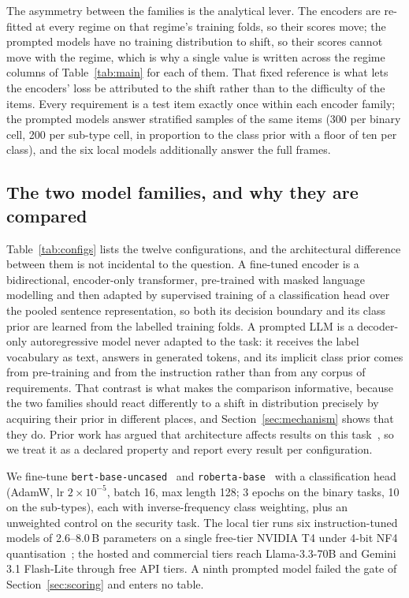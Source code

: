 \documentclass[conference]{IEEEtran}
\begin{document}
The asymmetry between the families is the analytical lever. The encoders are
re-fitted at every regime on that regime's training folds, so their scores move;
the prompted models have no training distribution to shift, so their scores
cannot move with the regime, which is why a single value is written across the
regime columns of Table~\ref{tab:main} for each of them. That fixed reference is
what lets the encoders' loss be attributed to the shift rather than to the
difficulty of the items. Every requirement is a test item exactly once within
each encoder family; the prompted models answer stratified samples of the same
items (300 per binary cell, 200 per sub-type cell, in proportion to the class
prior with a floor of ten per class), and the six local models additionally
answer the full frames.

\subsection{The two model families, and why they are compared}
\label{sec:families}
Table~\ref{tab:configs} lists the twelve configurations, and the architectural
difference between them is not incidental to the question. A fine-tuned encoder
is a bidirectional, encoder-only transformer, pre-trained with masked language
modelling and then adapted by supervised training of a classification head over
the pooled sentence representation, so both its decision boundary and its class
prior are learned from the labelled training folds. A prompted LLM is a
decoder-only autoregressive model never adapted to the task: it receives the
label vocabulary as text, answers in generated tokens, and its implicit class
prior comes from pre-training and from the instruction rather than from any
corpus of requirements. That contrast is what makes the comparison informative,
because the two families should react differently to a shift in distribution
precisely by acquiring their prior in different places, and
Section~\ref{sec:mechanism} shows that they do. Prior work has argued that
architecture affects results on this task~\cite{vasudevan2026}, so we treat it as
a declared property and report every result per configuration.

We fine-tune \texttt{bert-\allowbreak base-\allowbreak uncased}~\cite{devlin2019} and
\texttt{roberta-\allowbreak base}~\cite{liu2019} with a classification head (AdamW, lr
$2\times10^{-5}$, batch 16, max length 128; 3 epochs on the binary tasks, 10 on
the sub-types), each with inverse-frequency class weighting, plus an unweighted
control on the security task. The local tier runs six instruction-tuned models of
2.6--8.0\,B parameters on a single free-tier NVIDIA T4 under 4-bit NF4
quantisation~\cite{dettmers2023}; the hosted and commercial tiers reach
Llama-3.3-70B and Gemini 3.1 Flash-Lite through free API tiers. A ninth prompted
model failed the gate of Section~\ref{sec:scoring} and enters no table.
\end{document}
